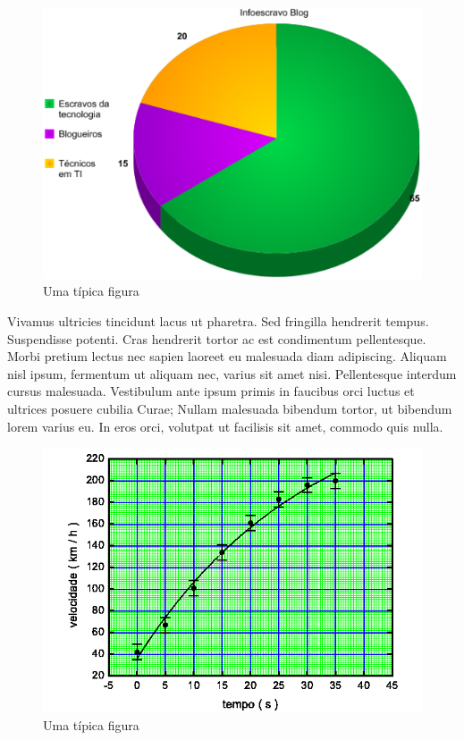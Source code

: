 \begin{figure}[!htp]
\centering
\includegraphics[scale = .5]{figures/graficos-online-gratis.png}
\caption{Uma típica figura}
\end{figure}


Vivamus ultricies tincidunt lacus ut pharetra. Sed fringilla hendrerit tempus. Suspendisse potenti. Cras hendrerit tortor ac est condimentum pellentesque. Morbi pretium lectus nec sapien laoreet eu malesuada diam adipiscing. Aliquam nisl ipsum, fermentum ut aliquam nec, varius sit amet nisi. Pellentesque interdum cursus malesuada. Vestibulum ante ipsum primis in faucibus orci luctus et ultrices posuere cubilia Curae; Nullam malesuada bibendum tortor, ut bibendum lorem varius eu. In eros orci, volutpat ut facilisis sit amet, commodo quis nulla.


\begin{figure}[!htp]
\centering
\includegraphics[scale = .5]{figures/graf-fig1.png}
\caption{Uma típica figura}
\end{figure}



